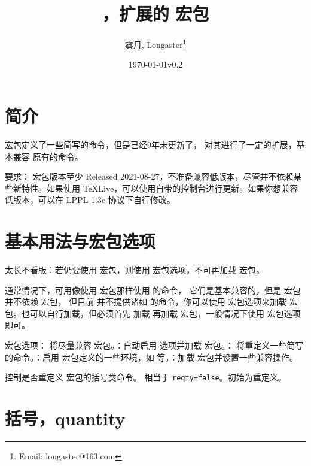 \documentclass{ctxdoc}
\author{雾月, Longaster\thanks{Email: longaster@163.com}}
\title{\pkg{physicx}，扩展的 \pkg{physics} 宏包}
\date{\today\quad v0.2}
\def\emph#1{\textcolor{red!80!black}{#1}}
\begin{document}
\maketitle

\tableofcontents


\section{简介}

 宏包定义了一些简写的命令，但是已经9年未更新了， 对其进行了一定的扩展，基本兼容  原有的命令。

要求： 宏包版本至少 Released 2021-08-27，\emph{不准备兼容低版本}，尽管并不依赖某些新特性。如果使用 TeXLive，可以使用自带的控制台进行更新。如果你想兼容低版本，可以在 \href{http://www.latex-project.org/lppl.txt}{LPPL 1.3c} 协议下自行修改。

\section{基本用法与宏包选项}

\emph{太长不看版}：若仍要使用  宏包，则使用  宏包选项，\emph{不可}再加载  宏包。

通常情况下，可用像使用  宏包那样使用  的命令，
它们是基本兼容的，但是  宏包并不依赖  宏包，
但目前  并不提供诸如  的命令，你可以使用  
宏包选项来加载  宏包。也可以自行加载，但必须首先
加载  再加载  宏包，一般情况下使用  
宏包选项即可。

宏包选项： 将尽量兼容  宏包。：自动启用  选项并加载  宏包。： 将重定义一些简写的命令。：启用  宏包定义的一些环境，如  等。：加载  宏包并设置一些兼容操作。

 控制是否重定义  宏包的括号类命令。 相当于 \verb|reqty=false|。初始为重定义。

\section{括号，quantity}\label{sec:quantity}
\end{document}

